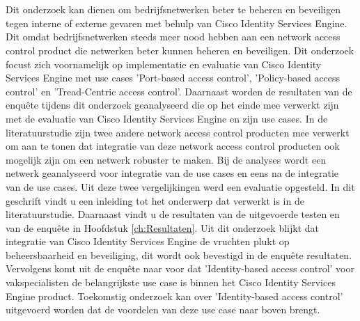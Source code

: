 \chapter*{}
\label{ch:Samenvatting}

Dit onderzoek kan dienen om bedrijfsnetwerken beter te beheren en beveiligen tegen interne of externe gevaren met behulp van Cisco Identity Services Engine. Dit omdat bedrijfsnetwerken steeds meer nood hebben aan een network access control product die netwerken beter kunnen beheren en beveiligen. Dit onderzoek focust zich voornamelijk op implementatie en evaluatie van Cisco Identity Services Engine met use cases 'Port-based access control', 'Policy-based access control' en 'Tread-Centric access control'. 
\newline
\newline
Daarnaast worden de resultaten van de enquête tijdens dit onderzoek geanalyseerd die op het einde mee verwerkt zijn met de evaluatie van Cisco Identity Services Engine en zijn use cases. In de literatuurstudie zijn twee andere network access control producten mee verwerkt om aan te tonen dat integratie van deze network access control producten ook mogelijk zijn om een netwerk robuster te maken. Bij de analyses wordt een netwerk geanalyseerd voor integratie van de use cases en eens na de integratie van de use cases. Uit deze twee vergelijkingen werd een evaluatie opgesteld. In dit geschrift vindt u een inleiding tot het onderwerp dat verwerkt is in de literatuurstudie. Daarnaast vindt u de resultaten van de uitgevoerde testen en van de enquête in Hoofdstuk \ref{ch:Resultaten}. 
\newline
\newline
Uit dit onderzoek blijkt dat integratie van Cisco Identity Services Engine de vruchten plukt op beheersbaarheid en beveiliging, dit wordt ook bevestigd in de enquête resultaten. Vervolgens komt uit de enquête naar voor dat 'Identity-based access control' voor vakspecialisten de belangrijkste use case is binnen het Cisco Identity Services Engine product. Toekomstig onderzoek kan over 'Identity-based access control' uitgevoerd worden dat de voordelen van deze use case naar boven brengt.
